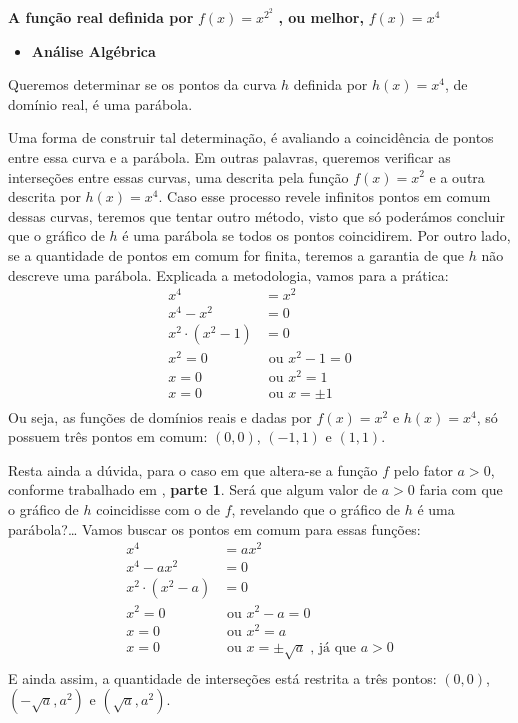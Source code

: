 \textbf{A função real definida por} \(f(x)=x^{2^2}\) \textbf{, ou melhor,} \(f(x)=x^4\)
\begin{itemize}
\item {} 
\textbf{Análise Algébrica}

\end{itemize}

Queremos determinar se os pontos da curva \(h\) definida por \(h(x)=x^4\), de domínio real, é uma parábola.

Uma forma de construir tal determinação, é avaliando a coincidência de pontos entre essa curva e a parábola. Em outras palavras, queremos verificar as interseções entre essas curvas, uma descrita pela função \(f(x) = x^2\) e a outra descrita por \(h(x)=x^4\). Caso esse processo revele infinitos pontos em comum dessas curvas, teremos que tentar outro método, visto que só poderámos concluir que o gráfico de \(h\) é uma parábola se todos os pontos coincidirem. Por outro lado, se a quantidade de pontos em comum for finita, teremos a garantia de que \(h\) não descreve uma parábola. Explicada a metodologia, vamos para a prática:
\begin{equation*}
\begin{split}x^4 & = x^2 \\
x^4-x^2 & = 0 \\
x^2 \cdot (x^2-1) & = 0 \\
x^2 = 0 & \text{ ou } x^2-1=0 \\
x = 0 & \text{ ou } x^2=1 \\
x = 0 & \text{ ou } x = \pm 1 \\\end{split}
\end{equation*}
Ou seja, as funções de domínios reais e dadas por \(f(x)=x^2\) e \(h(x)=x^4\), só possuem três pontos em comum: \((0,0)\), \((-1,1)\) e \((1,1)\).

Resta ainda a dúvida, para o caso em que altera-se a função \(f\) pelo fator \(a>0\), conforme trabalhado em , \textbf{parte 1}. Será que algum valor de \(a>0\) faria com que o gráfico de \(h\) coincidisse com o de \(f\), revelando que o gráfico de \(h\) é uma parábola?… Vamos buscar os pontos em comum para essas funções:
\begin{equation*}
\begin{split}x^4 & = ax^2 \\
x^4-ax^2 & = 0 \\
x^2 \cdot (x^2-a) & = 0 \\
x^2 = 0 & \text{ ou }  x^2-a=0 \\
x = 0 & \text{ ou }  x^2=a \\
x = 0 & \text{ ou }  x = \pm \sqrt{a}\; \text{, já que }  a>0 \\\end{split}
\end{equation*}
E ainda assim, a quantidade de interseções está restrita a três pontos: \((0,0)\), \((-\sqrt{a},a^2)\) e \((\sqrt{a},a^2)\).

